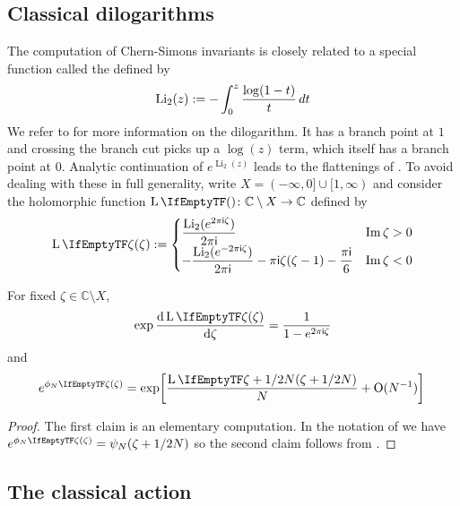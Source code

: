 \documentclass[margincite, leqno]{sl2art}
\numberwithin{equation}{section}
\begin{document}
\subsection{Classical dilogarithms}%
\label{sec:Classical dilogarithms}

The computation of Chern-Simons invariants is closely related to a
special function called the  defined by
\[
  \operatorname{Li}_{2}(z)
  \mathrel{:=}
  - \int_{0}^{z} \frac{\log(1 - t)}{t} \, d t
\]
We refer to \textcite{Zagier2007} for more information on the dilogarithm.
It has a branch point at \(1\) and crossing the branch cut picks up a
\(\log(z)\) term, which itself has a branch point at \(0\).
Analytic continuation of \(e^{\operatorname{Li}_{2}(z)}\) leads to
the flattenings of \citeauthor{Neumann2004} \cite{Neumann2004}.
To avoid dealing with these in full generality, write \(X = (-\infty,
0] \cup [1, \infty)\) and consider \cite[Chapter 4]{Murakami2018} the
holomorphic function \(\dll{} \colon \mathbb{C} \setminus X \to
\mathbb{C}\) defined by
\begin{equation}
  \dll{\zeta}
  \defeq
  \begin{cases}
    \displaystyle
    \frac{
      \operatorname{Li}_{2}(e^{\tu \zeta})
    }{
      \tu
    }
    &
    \Im \zeta > 0
    \\
    \displaystyle
    -
    \frac{
      \operatorname{Li}_{2}(e^{-\tu \zeta})
    }{
      \tu
    }
    - \pi \ii \zeta(\zeta -1)
    - \frac{\pi \ii}{6}
    &
    \Im \zeta < 0
  \end{cases}
\end{equation}

\begin{lemma}
  \label{thm:dilog lemma}
  For fixed \(\zeta \in \mathbb{C} \setminus X \),
  \[
    \exp \frac{ \mathrm{d} \dll{\zeta}}{\mathrm{d} \zeta}
    =
    \frac{
      1
    }{
      1 - e^{\tu \zeta}
    }
  \]
  and
  \[
    e^{\pfl{\zeta}}
    =
    \exp\leftfun[
      \frac{
        \dll{\zeta + 1/2\nr}
      }{\nr}
      +
      \bigoh(\nr^{-1})
    \rightfun]
    \qedhere
  \]
\end{lemma}

\begin{proof}
  The first claim is an elementary computation.
  In the notation of \textcite{Murakami2018} we have \(
  e^{\pfl{\zeta}} = \psi_{\nr}(\zeta + 1/2\nr) \) so the second claim
  follows from \cite[eq.\ (4.3)]{Murakami2018}.
\end{proof}

\subsection{The classical action}%
\label{sec:The classical action}
\end{document}
